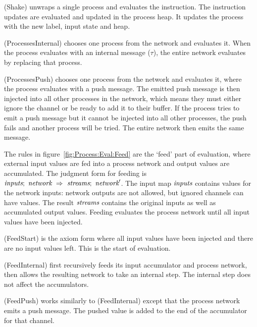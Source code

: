 (Shake) unwraps a single process and evaluates the instruction.
The instruction updates are evaluated and updated in the process heap.
It updates the process with the new label, input state and heap.

(ProcessesInternal) chooses one process from the network and evaluates it.
When the process evaluates with an internal message ($\tau$), the entire network evaluates by replacing that process.

(ProcessesPush) chooses one process from the network and evaluates it, where the process evaluates with a push message.
The emitted push message is then injected into all other processes in the network, which means they must either ignore the channel or be ready to add it to their buffer.
If the process tries to emit a push message but it cannot be injected into all other processes, the push fails and another process will be tried.
The entire network then emits the same message.

The rules in figure~\ref{fig:Process:Eval:Feed} are the `feed' part of evaluation, where external input values are fed into a process network and output values are accumulated.
The judgment form for feeding is $\textit{inputs};~\textit{network}~\Rightarrow~\textit{streams};~\textit{network}'$.
The input map $\textit{inputs}$ contains values for the network inputs: network outputs are not allowed, but ignored channels can have values.
The result $\textit{streams}$ contains the original inputs as well as accumulated output values.
Feeding evaluates the process network until all input values have been injected.


(FeedStart) is the axiom form where all input values have been injected and there are no input values left.
This is the start of evaluation.

(FeedInternal) first recursively feeds its input accumulator and process network, then allows the resulting network to take an internal step.
The internal step does not affect the accumulators.

(FeedPush) works similarly to (FeedInternal) except that the process network emits a push message.
The pushed value is added to the end of the accumulator for that channel.

